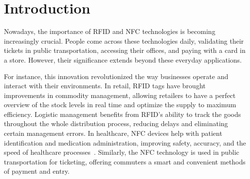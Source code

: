 \chapter*{Introduction}
\setcounter{page}{1}


Nowadays, the importance of RFID and NFC technologies is becoming increasingly crucial. People come across these technologies daily, validating their tickets in public transportation, accessing their offices, and paying with a card in a store. However, their significance extends beyond these everyday applications.

For instance, this innovation revolutionized the way businesses operate and interact with their environments. In retail, RFID tags have brought improvements in commodity management, allowing retailers to have a perfect overview of the stock levels in real time and optimize the supply to maximum efficiency. Logistic management benefits from RFID's ability to track the goods throughout the whole distribution process, reducing delays and eliminating certain management errors. In healthcare, NFC devices help with patient identification and medication administration, improving safety, accuracy, and the speed of healthcare processes~\cite{pirrone2012mobile}. Similarly, the NFC technology is used in public transportation for ticketing, offering commuters a smart and convenient methods of payment and entry.

